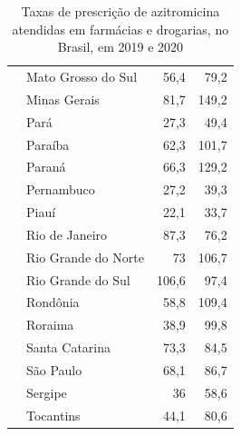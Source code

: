 \begin{table}[!htbp]
\begin{tabular}{llrr}
                      & Mato Grosso do Sul                   & 56,4                       & 79,2                       \\
                      & Minas Gerais                         & 81,7                       & 149,2                      \\
                      & Pará                                 & 27,3                       & 49,4                       \\
                      & Paraíba                              & 62,3                       & 101,7                      \\
                      & Paraná                               & 66,3                       & 129,2                      \\
                      & Pernambuco                           & 27,2                       & 39,3                       \\
                      & Piauí                                & 22,1                       & 33,7                       \\
                      & Rio de Janeiro                       & 87,3                       & 76,2                       \\
                      & Rio Grande do Norte                  & 73                         & 106,7                      \\
                      & Rio Grande do Sul                    & 106,6                      & 97,4                       \\
                      & Rondônia                             & 58,8                       & 109,4                      \\
                      & Roraima                              & 38,9                       & 99,8                       \\
                      & Santa Catarina                       & 73,3                       & 84,5                       \\
                      & São Paulo                            & 68,1                       & 86,7                       \\
                      & Sergipe                              & 36                         & 58,6                       \\
                      & Tocantins                            & 44,1                       & 80,6                       \\ \hline
    \end{tabular}
    \caption{Taxas de prescrição de azitromicina atendidas em farmácias e drogarias, no Brasil, em 2019 e 2020}
    \label{table:base_region1}
    \end{table}


